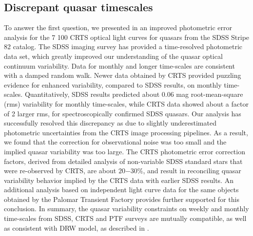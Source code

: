 \documentclass[modern]{aastex62}
\begin{document}
\subsection{Discrepant quasar timescales}
To answer the first question, we presented in \cite{suberlak2017} an improved photometric error analysis for the 7 100 CRTS optical light curves for quasars from the SDSS Stripe 82 catalog. The SDSS imaging survey has provided a time-resolved photometric data set, which greatly improved our understanding of the quasar optical continuum variability. Data for monthly and longer time-scales are consistent with a damped random walk. Newer data obtained by CRTS provided puzzling evidence for enhanced variability, compared to SDSS results, on monthly time-scales. Quantitatively, SDSS results predicted about 0.06 mag root-mean-square (rms) variability for monthly time-scales, while CRTS data showed about a factor of 2 larger rms, for spectroscopically confirmed SDSS quasars. Our analysis has successfully resolved this discrepancy as due to slightly underestimated photometric uncertainties from the CRTS image processing pipelines. As a result, we found that the correction for observational noise was too small and the implied quasar variability was too large. The CRTS photometric error correction factors, derived from detailed analysis of non-variable SDSS standard stars that were re-observed by CRTS, are about $20 \mathrm{-} 30 \%$, and result in reconciling quasar variability behavior implied by the CRTS data with earlier SDSS results. An additional analysis based on independent light curve data for the same objects obtained by the Palomar Transient Factory provides further supported for this conclusion. In summary, the quasar variability constraints on weekly and monthly time-scales from SDSS, CRTS and PTF surveys are mutually compatible, as well as consistent with DRW model, as described in \cite{suberlak2017}. 
\end{document}
